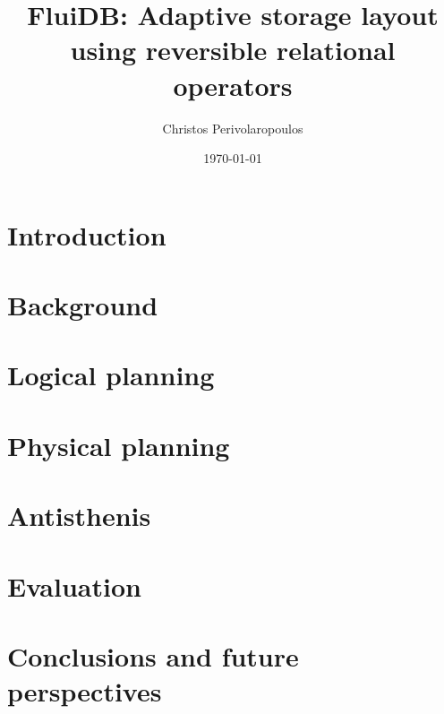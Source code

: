 \documentclass{beamer}
\title{FluiDB: Adaptive storage layout using reversible relational operators}
\author{Christos Perivolaropoulos}
\institute{University of Edinburgh}
\date{\today}
\begin{document}
\begin{frame}
\titlepage
\end{frame}

\section{Introduction}
\label{section:introduction}


\section{Background}
\label{section:background}


\section{Logical planning}
\label{section:fluidb_logical_planning}


\section{Physical planning}
\label{section:physical_planning}


\section{Antisthenis}
\label{section:antisthenis}


% 

\section{Evaluation}
\label{section:evaluation}


\section{Conclusions and future perspectives}
\label{section:conclusion}

\end{document}
